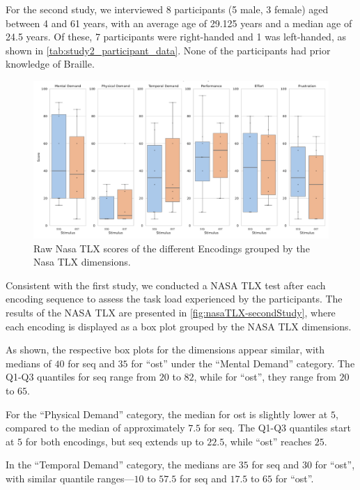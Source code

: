 For the second study, we interviewed 8 participants (5 male, 3 female) aged between 4 and 61 years, with an average age of 29.125 years and a median age of 24.5 years. Of these, 7 participants were right-handed and 1 was left-handed, as shown in \autoref{tab:study2_participant_data}. None of the participants had prior knowledge of Braille.


\begin{figure}
    \centering
    \includegraphics[width=\linewidth]{src/pictures/Study2Data_questionnaire/nasaTLX_study2.pdf}
    \caption{Raw Nasa TLX scores of the different Encodings grouped by the Nasa TLX dimensions.}
    \label{fig:nasaTLX-secondStudy}
\end{figure}

Consistent with the first study, we conducted a NASA TLX test after each encoding sequence to assess the task load experienced by the participants. The results of the NASA TLX are presented in \autoref{fig:nasaTLX-secondStudy}, where each encoding is displayed as a box plot grouped by the NASA TLX dimensions.

As shown, the respective box plots for the dimensions appear similar, with medians of $40$ for \gls{seq} and $35$ for \enquote{ost} under the \enquote{Mental Demand} category. The Q1-Q3 quantiles for \gls{seq} range from $20$ to $82$, while for \enquote{ost}, they range from $20$ to $65$.

For the \enquote{Physical Demand} category, the median for \gls{ost} is slightly lower at $5$, compared to the median of approximately $7.5$ for \gls{seq}. The Q1-Q3 quantiles start at $5$ for both encodings, but \gls{seq} extends up to $22.5$, while \enquote{ost} reaches $25$.

In the \enquote{Temporal Demand} category, the medians are $35$ for \gls{seq} and $30$ for \enquote{ost}, with similar quantile ranges—$10$ to $57.5$ for \gls{seq} and $17.5$ to $65$ for \enquote{ost}.

